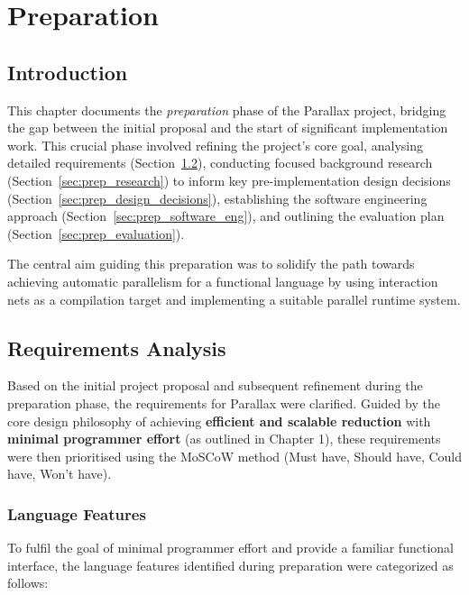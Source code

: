 \chapter{Preparation}\label{chap:preparation}

\section{Introduction}\label{sec:prep_intro}

This chapter documents the \textit{preparation} phase of the Parallax project, bridging the gap between the initial proposal and the start of significant implementation work. This crucial phase involved refining the project's core goal, analysing detailed requirements (Section~\ref{sec:prep_requirements}), conducting focused background research (Section~\ref{sec:prep_research}) to inform key pre-implementation design decisions (Section~\ref{sec:prep_design_decisions}), establishing the software engineering approach (Section~\ref{sec:prep_software_eng}), and outlining the evaluation plan (Section~\ref{sec:prep_evaluation}).

The central aim guiding this preparation was to solidify the path towards achieving automatic parallelism for a functional language by using interaction nets as a compilation target and implementing a suitable parallel runtime system.

\section{Requirements Analysis}\label{sec:prep_requirements}
Based on the initial project proposal and subsequent refinement during the preparation phase, the requirements for Parallax were clarified. Guided by the core design philosophy of achieving \textbf{efficient and scalable reduction} with \textbf{minimal programmer effort} (as outlined in Chapter 1), these requirements were then prioritised using the MoSCoW method (Must have, Should have, Could have, Won't have).

\subsection{Language Features}

To fulfil the goal of minimal programmer effort and provide a familiar functional interface, the language features identified during preparation were categorized as follows:

